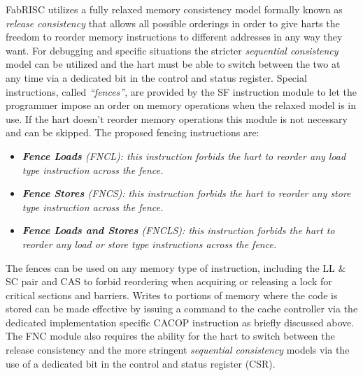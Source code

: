         \vspace{10pt}

        FabRISC utilizes a fully relaxed memory consistency model formally known as \textit{release consistency} that allows all possible orderings in order to give harts the freedom to reorder memory instructions to different addresses in any way they want. For debugging and specific situations the stricter \textit{sequential consistency} model can be utilized and the hart must be able to switch between the two at any time via a dedicated bit in the control and status register. Special instructions, called \textit{``fences''}, are provided by the SF instruction module to let the programmer impose an order on memory operations when the relaxed model is in use. If the hart doesn't reorder memory operations this module is not necessary and can be skipped. The proposed fencing instructions are:

        \begin{itemize}

            \item \textit{\textbf{Fence Loads} (FNCL): this instruction forbids the hart to reorder any load type instruction across the fence.}

            \item \textit{\textbf{Fence Stores} (FNCS): this instruction forbids the hart to reorder any store type instruction across the fence.}

            \item \textit{\textbf{Fence Loads and Stores} (FNCLS): this instruction forbids the hart to reorder any load or store type instructions across the fence.}

        \end{itemize}

        The fences can be used on any memory type of instruction, including the LL \& SC pair and CAS to forbid reordering when acquiring or releasing a lock for critical sections and barriers. Writes to portions of memory where the code is stored can be made effective by issuing a command to the cache controller via the dedicated implementation specific CACOP instruction as briefly discussed above. The FNC module also requires the ability for the hart to switch between the release consistency and the more stringent \textit{sequential consistency} models via the use of a dedicated bit in the control and status register (CSR).

